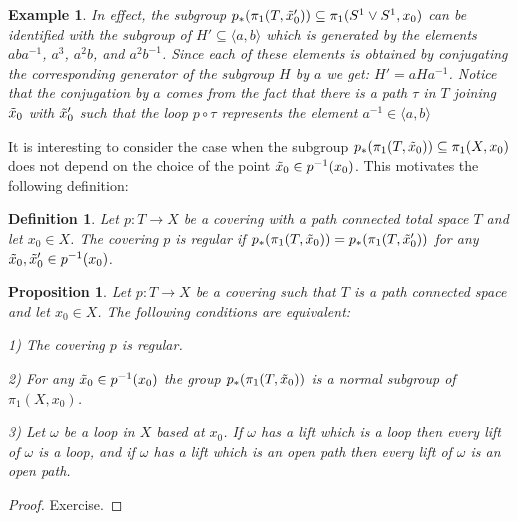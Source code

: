 \documentclass[11pt, letterpaper, oneside]{report}
\theoremstyle{pplain}
\newtheorem{proposition}[theorem]{Proposition}
\theoremstyle{ddefinition}
\newtheorem{definition}[theorem]{Definition}
\newtheorem{example}[theorem]{Example}
\theoremstyle{nnn}
\theoremstyle{eexercise}
\newcommand{\ntilde}{\skew{3}\tilde}
\begin{document}
\begin{example}
In effect, the subgroup $p_{\ast}(\pi_{1}(T, \ntilde{x}'_{0}))\subseteq \pi_{1}(S^{1}\vee S^{1}, x_{0})$ can be identified with 
the subgroup of $H' \subseteq \langle a, b\rangle$ which is generated by the elements $aba^{-1}$, 
$a^{3}$, $a^{2}b$, and $a^{2}b^{-1}$. Since each of these elements is obtained by conjugating the 
corresponding generator of the subgroup $H$ by  $a$  we get: $H' = aHa^{-1}$. 
Notice that the conjugation by $a$ comes from the fact that there is a path $\tau$ in $T$ joining 
$\ntilde{x}_{0}$ with $\ntilde{x}'_{0}$ such that the loop $p\circ \tau$ represents the element $a^{-1}\in \langle a, b\rangle$

\end{example}


It is interesting to consider the case when the subgroup $p_{\ast}(\pi_{1}(T, \ntilde{x}_{0}))\subseteq \pi_{1}(X, x_{0})$ 
does not depend on the choice of the point $\ntilde{x}_{0} \in p^{-1}(x_{0})$. This motivates the following definition:


\begin{definition}
Let $p\colon T \to X$ be a covering with a path connected total space $T$ and let $x_{0}\in X$. The covering 
$p$ is \emph{regular} if $p_{\ast}(\pi_{1}(T, \ntilde{x}_{0})) = p_{\ast}(\pi_{1}(T, \ntilde{x}'_{0}))$ for any 
$\ntilde{x}_{0}, \ntilde{x}'_{0}\in p^{-1}(x_{0})$. 
\end{definition}



\begin{proposition}
\label{REGULARCOV PROP}
Let $p\colon T\to X$ be a covering such that $T$ is a path connected space and let $x_{0}\in X$. The following
conditions are equivalent:

1) The covering $p$ is regular.

2) For any $\ntilde{x}_{0} \in p^{-1}(x_{0})$ the group $p_{\ast}(\pi_{1}(T, \ntilde{x}_{0}))$ is a normal subgroup 
of $\pi_{1}(X, x_{0})$.

3) Let $\omega$ be a loop in $X$ based at $x_{0}$.  If $\omega$ has a lift which is a loop then every lift of $\omega$
is a loop, and if $\omega$ has a lift which is an open path then every lift of $\omega$ is an open path.  

\end{proposition}


\begin{proof}
Exercise. 
\end{proof}
\end{document}
